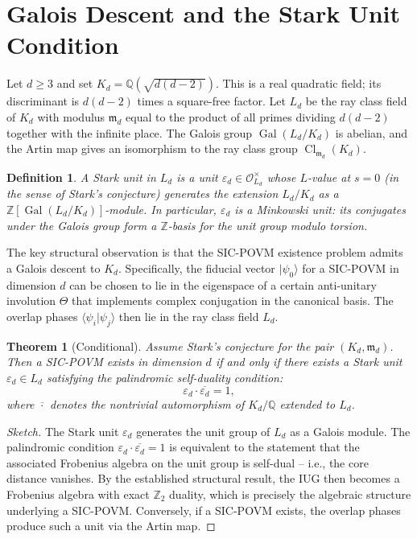 \documentclass{article}
\newtheorem{theorem}{Theorem}
\newtheorem{definition}{Definition}
\begin{document}
\section{Galois Descent and the Stark Unit Condition}

Let $d \geq 3$ and set $K_d = \mathbb{Q}(\sqrt{d(d-2)})$. This is a real quadratic field; its discriminant is $d(d-2)$ times a square-free factor. Let $L_d$ be the ray class field of $K_d$ with modulus $\mathfrak{m}_d$ equal to the product of all primes dividing $d(d-2)$ together with the infinite place. The Galois group $\operatorname{Gal}(L_d/K_d)$ is abelian, and the Artin map gives an isomorphism to the ray class group $\operatorname{Cl}_{\mathfrak{m}_d}(K_d)$.

\begin{definition}
A \emph{Stark unit} in $L_d$ is a unit $\varepsilon_d \in \mathcal{O}_{L_d}^\times$ whose $L$-value at $s=0$ (in the sense of Stark's conjecture) generates the extension $L_d/K_d$ as a $\mathbb{Z}[\operatorname{Gal}(L_d/K_d)]$-module. In particular, $\varepsilon_d$ is a Minkowski unit: its conjugates under the Galois group form a $\mathbb{Z}$-basis for the unit group modulo torsion.
\end{definition}

The key structural observation is that the SIC-POVM existence problem admits a Galois descent to $K_d$. Specifically, the fiducial vector $|\psi_0\rangle$ for a SIC-POVM in dimension $d$ can be chosen to lie in the eigenspace of a certain anti-unitary involution $\Theta$ that implements complex conjugation in the canonical basis. The overlap phases $\langle\psi_i|\psi_j\rangle$ then lie in the ray class field $L_d$.

\begin{theorem}[Conditional]
Assume Stark's conjecture for the pair $(K_d, \mathfrak{m}_d)$. Then a SIC-POVM exists in dimension $d$ if and only if there exists a Stark unit $\varepsilon_d \in L_d$ satisfying the \emph{palindromic self-duality} condition:
\[
\varepsilon_d \cdot \overline{\varepsilon_d} = 1,
\]
where $\overline{\cdot}$ denotes the nontrivial automorphism of $K_d/\mathbb{Q}$ extended to $L_d$.
\end{theorem}

\begin{proof}[Sketch]
The Stark unit $\varepsilon_d$ generates the unit group of $L_d$ as a Galois module. The palindromic condition $\varepsilon_d \cdot \overline{\varepsilon_d} = 1$ is equivalent to the statement that the associated Frobenius algebra on the unit group is self-dual -- i.e., the core distance vanishes. By the established structural result, the IUG then becomes a Frobenius algebra with exact $\mathbb{Z}_2$ duality, which is precisely the algebraic structure underlying a SIC-POVM. Conversely, if a SIC-POVM exists, the overlap phases produce such a unit via the Artin map.
\end{proof}
\end{document}
